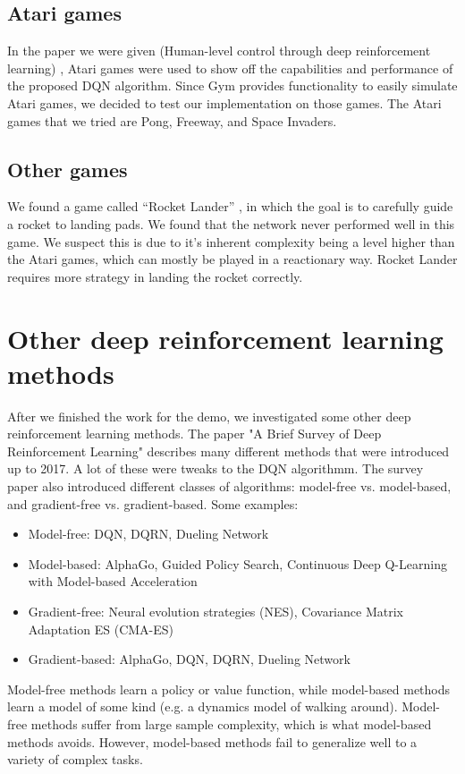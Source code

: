 \documentclass[12pt, conference, compsoc]{IEEEtran}
\begin{document}
\subsection{Atari games}
In the paper we were given (Human-level control through deep reinforcement learning) \cite{mnih2015humanlevel}, Atari games were used to show off the capabilities and performance of the proposed DQN algorithm. Since Gym provides functionality to easily simulate Atari games, we decided to test our implementation on those games. The Atari games that we tried are Pong, Freeway, and Space Invaders.

\subsection{Other games}
We found a game called ``Rocket Lander'' \cite{RocketLander}, in which the goal is to carefully guide a rocket to landing pads. We found that the network never performed well in this game. We suspect this is due to it's inherent complexity being a level higher than the Atari games, which can mostly be played in a reactionary way. Rocket Lander requires more strategy in landing the rocket correctly.

\section{Other deep reinforcement learning methods}
After we finished the work for the demo, we investigated some other deep reinforcement learning methods. The paper "A Brief Survey of Deep Reinforcement Learning" \cite{brief-survey} describes many different methods that were introduced up to 2017. A lot of these were tweaks to the DQN algorithmm. The survey paper also introduced different classes of algorithms: model-free vs. model-based, and gradient-free vs. gradient-based. Some examples:
\begin{itemize}
    \item Model-free: DQN, DQRN, Dueling Network
    \item Model-based: AlphaGo, Guided Policy Search, Continuous Deep Q-Learning with Model-based Acceleration
    \item Gradient-free: Neural evolution strategies (NES), Covariance Matrix Adaptation ES (CMA-ES)
    \item Gradient-based: AlphaGo, DQN, DQRN, Dueling Network
\end{itemize}
Model-free methods learn a policy or value function, while model-based methods learn a model of some kind (e.g. a dynamics model of walking around). Model-free methods suffer from large sample complexity, which is what model-based methods avoids. However, model-based methods fail to generalize well to a variety of complex tasks.
\end{document}
